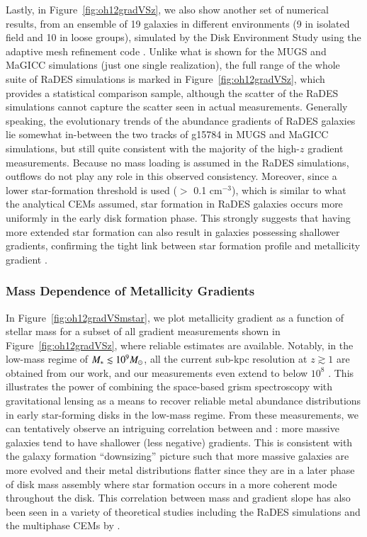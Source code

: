 Lastly, in Figure~\ref{fig:oh12gradVSz}, we also show another set of numerical results, from
an ensemble of 19 galaxies in different environments (9 in isolated field and 10 in loose
groups), simulated by the \ramses Disk Environment Study \citep[RaDES,][]{Few:2012jl} using
the adaptive mesh refinement code \ramses.  Unlike what is shown for the MUGS and MaGICC
simulations (\ie just one single realization), the full range of the whole suite of RaDES
simulations is marked in Figure~\ref{fig:oh12gradVSz}, which provides a statistical
comparison sample, although the scatter of the RaDES simulations cannot capture the scatter
seen in actual measurements.
Generally speaking, the evolutionary trends of the abundance gradients of RaDES galaxies lie
somewhat in-between the two tracks of g15784 in MUGS and MaGICC simulations, but still quite
consistent with the majority of the high-$z$ gradient measurements.
Because no mass loading is assumed in the RaDES simulations, outflows do not play any role in
this observed consistency.
Moreover, since a lower star-formation threshold is used ($>$ 0.1 cm$^{-3}$), which is
similar to what the analytical CEMs assumed, star formation in RaDES
galaxies occurs more uniformly in the early disk formation phase.  This strongly suggests
that having more extended star formation can also result in galaxies possessing shallower
gradients, confirming the tight link between star formation profile and metallicity gradient
\citep{Pilkington:2012ib}.


\subsubsection{Mass Dependence of Metallicity Gradients}\label{subsubsect:gradVSm}

In Figure~\ref{fig:oh12gradVSmstar}, we plot metallicity gradient as a function of stellar mass for a subset of all
gradient measurements shown in Figure~\ref{fig:oh12gradVSz}, where reliable \Mstar estimates are available.
Notably, in the low-mass regime of $M_\ast\lesssim10^9M_\odot$, all the current sub-kpc
resolution \mgms at $z\gtrsim1$ are obtained from our work, and our measurements even extend
to below $10^8$ \Msun.
This illustrates the power of combining the space-based grism spectroscopy with
gravitational lensing as a means to recover reliable metal abundance distributions in
early star-forming disks in the low-mass regime.
From these measurements, we can tentatively observe an intriguing correlation between \Mstar and \mg:
more massive galaxies tend to have shallower (less negative) gradients.
This is consistent with the galaxy formation ``downsizing'' picture \citep[see, \eg,][]{Brinchmann:2004hy,Fontanot:2009fp} such 
that more massive galaxies are more evolved and their metal distributions flatter since they are in a later phase of disk mass 
assembly where star formation occurs in a more coherent mode throughout the disk.
This correlation between mass and gradient slope has also been seen in a variety of theoretical studies including the RaDES 
simulations \citep{Few:2012jl} and the multiphase CEMs by \citep{Molla:2005eq}.

